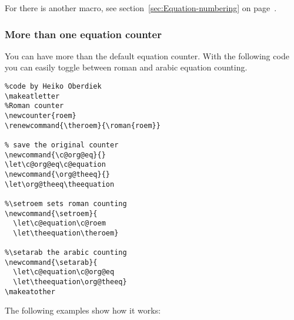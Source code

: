 For \AmSmath there is another macro, see section~\ref{sec:Equation-numbering} on
page~\pageref{sec:Equation-numbering}.

\subsubsection{More than one equation counter}
You can have more than the default equation counter. With the following code you
can easily toggle between roman and arabic equation counting.
\makeatletter
\renewcommand{\theroem}{\roman{roem}}

\newcommand{\c@org@eq}{}
\let\c@org@eq\c@equation
\newcommand{\org@theeq}{}
\let\org@theeq\theequation

\newcommand{\setroem}{
  \let\c@equation\c@roem
  \let\theequation\theroem}

\newcommand{\setarab}{
  \let\c@equation\c@org@eq
  \let\theequation\org@theeq}
\makeatother

\begin{lstlisting}
%code by Heiko Oberdiek
\makeatletter
%Roman counter
\newcounter{roem}
\renewcommand{\theroem}{\roman{roem}}

% save the original counter
\newcommand{\c@org@eq}{}
\let\c@org@eq\c@equation
\newcommand{\org@theeq}{}
\let\org@theeq\theequation

%\setroem sets roman counting
\newcommand{\setroem}{
  \let\c@equation\c@roem
  \let\theequation\theroem}

%\setarab the arabic counting
\newcommand{\setarab}{
  \let\c@equation\c@org@eq
  \let\theequation\org@theeq}
\makeatother
\end{lstlisting}

The following examples show how it works:

